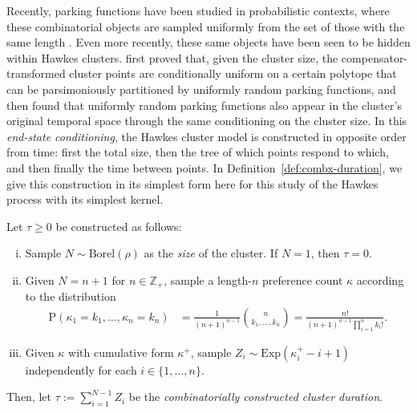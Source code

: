 \documentclass[opre,nonblindrev]{informs3_no_remark}
\newcommand{\PP}[1]{\mathrm{P}\left( #1 \right)}
\begin{document}
Recently, parking functions have been studied in probabilistic contexts, where these combinatorial objects are sampled uniformly from the set of those with the same length \citep[see, e.g.,][]{diaconis2017probabilizing,kenyon2023parking}. Even more recently, these same objects have been seen to be hidden within Hawkes clusters. \citet{daw2023conditional} first proved that, given the cluster size, the compensator-transformed cluster points are conditionally uniform on a certain polytope that can be parsimoniously partitioned by uniformly random parking functions, and \citet{daw2026asymmetries} then found that uniformly random parking functions also appear in the cluster's original temporal space through the same conditioning on the cluster size.  
In this \emph{end-state conditioning}, the Hawkes cluster model is constructed in opposite order from time: first the total size, then the tree of which points respond to which, and then finally the time between points. In Definition~\ref{def:combx-duration}, we give this construction in its simplest form here for this study of the Hawkes process with its simplest kernel.


\begin{definition} \label{def:combx-duration}
Let $\tau \geq 0$ be constructed as follows:
\begin{enumerate}[i)]
    \item Sample $N \sim \mathrm{Borel}(\rho)$ as the \emph{size} of the cluster. If $N=1$, then $\tau = 0$.
    \item Given $N = n + 1$ for $n \in \mathbb{Z}_+$, sample a length-$n$ preference count $\kappa$ according to the distribution 
    \begin{align}
\PP{\kappa_1 = k_1, \dots, \kappa_n = k_n}
&=
\frac{1}{(n+1)^{n-1}}{n \choose k_1, \dots, k_n}
=
\frac{n!}{(n+1)^{n-1}\prod_{i=1}^n k_i !}
.
\label{kappaDist}
\end{align}
    \item Given $\kappa$ with cumulative form $\kappa^+$, sample $Z_i \sim \mathrm{Exp}(\kappa^+_i -i  + 1)$ independently for each $i \in \{1, \dots, n\}$.
\end{enumerate}
Then, let $\tau := \sum_{i=1}^{N-1} Z_i$ be the \emph{combinatorially constructed cluster duration}.   
\hfill \Halmos
\end{definition}
\end{document}
